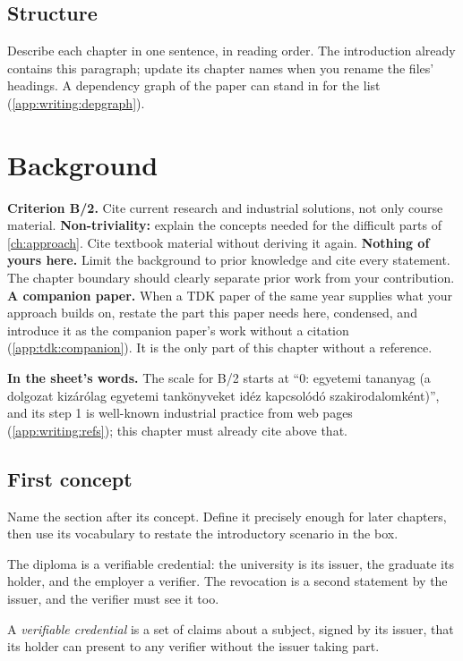 \subsection{Structure}\label{app:chapters:structure}
Describe each chapter in one sentence, in reading order. The introduction already contains this paragraph; update its chapter names when you rename the files' headings. A dependency graph of the paper can stand in for the list (\cref{app:writing:depgraph}).

\section{Background}\label{app:chapters:background}
\textbf{Criterion B/2.} Cite current research and industrial solutions, not only course material.
\textbf{Non-triviality:} explain the concepts needed for the difficult parts of \cref{ch:approach}. Cite textbook material without deriving it again.
\textbf{Nothing of yours here.} Limit the background to prior knowledge and cite every statement. The chapter boundary should clearly separate prior work from your contribution.
\textbf{A companion paper.} When a TDK paper of the same year supplies what your approach builds on, restate the part this paper needs here, condensed, and introduce it as the companion paper's work without a citation (\cref{app:tdk:companion}). It is the only part of this chapter without a reference.

\textbf{In the sheet's words.} The scale for B/2 starts at \enquote{0: egyetemi tananyag (a dolgozat kizárólag egyetemi tankönyveket idéz kapcsolódó szakirodalomként)}, and its step 1 is well-known industrial practice from web pages (\cref{app:writing:refs}); this chapter must already cite above that.

\subsection[First concept]{First concept\skimmark}\label{app:chapters:first-concept}
Name the section after its concept. Define it precisely enough for later chapters, then use its vocabulary to restate the introductory scenario in the box.
\begin{runningexample}
The diploma is a verifiable credential: the university is its \gls{issuer}, the graduate its \gls{holder}, and the employer a \gls{verifier}. The revocation is a second statement by the issuer, and the verifier must see it too.
\end{runningexample}
\begin{definition}\label{def:guide:vc}
A \emph{verifiable credential} is a set of claims about a subject, signed by its issuer, that its holder can present to any verifier without the issuer taking part.
\end{definition}

